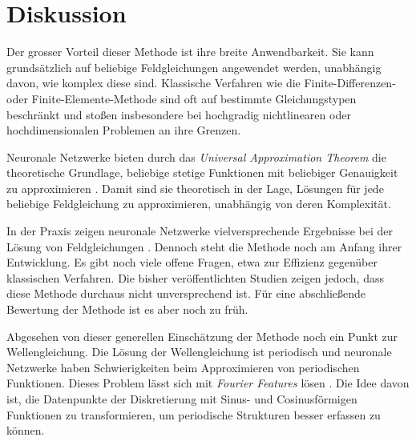 %
%
%
%

\section{Diskussion\label{neuronal:section:diskussion}}

Der grosser Vorteil dieser Methode ist ihre breite Anwendbarkeit.
Sie kann grundsätzlich auf beliebige Feldgleichungen angewendet werden, unabhängig davon, wie komplex diese sind.
Klassische Verfahren wie die Finite-Differenzen- oder Finite-Elemente-Methode sind oft auf bestimmte Gleichungstypen beschränkt und stoßen insbesondere bei hochgradig nichtlinearen oder hochdimensionalen Problemen an ihre Grenzen.

Neuronale Netzwerke bieten durch das \emph{Universal Approximation Theorem} die theoretische Grundlage, beliebige stetige Funktionen mit beliebiger Genauigkeit zu approximieren \cite{neuronal:universal_approximation_theorem}. 
Damit sind sie theoretisch in der Lage, Lösungen für jede beliebige Feldgleichung zu approximieren, unabhängig von deren Komplexität.

In der Praxis zeigen neuronale Netzwerke vielversprechende Ergebnisse bei der Lösung von Feldgleichungen \cite{neuronal:pinns}. 
Dennoch steht die Methode noch am Anfang ihrer Entwicklung. 
Es gibt noch viele offene Fragen, etwa zur Effizienz gegenüber klassischen Verfahren.
Die bisher veröffentlichten Studien zeigen jedoch, dass diese Methode durchaus nicht unversprechend ist.
Für eine abschließende Bewertung der Methode ist es aber noch zu früh. 

Abgesehen von dieser generellen Einschätzung der Methode noch ein Punkt zur Wellengleichung.
Die Lösung der Wellengleichung ist periodisch und neuronale Netzwerke haben Schwierigkeiten beim Approximieren von periodischen Funktionen.
Dieses Problem lässt sich mit \emph{Fourier Features} lösen \cite{neuronal:fourier_features}.
Die Idee davon ist, die Datenpunkte der Diskretierung mit Sinus- und Cosinusförmigen Funktionen zu transformieren, um periodische Strukturen besser erfassen zu können.
